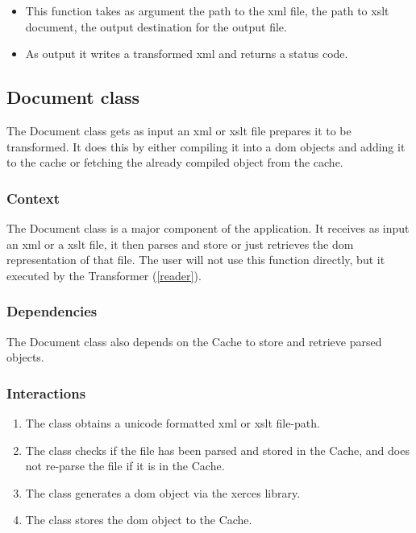 \begin{enmerate}
\begin{itemize}
  \item This function takes as argument the path to the \gls{xml} file, the path to \gls{xslt} document, the output destination for the output file.
  \item As output it writes a transformed \gls{xml} and returns a status code.
\end{itemize}

\subsection{Document class}
\label{document}
\label{parser}

The Document class gets as input an \gls{xml} or \gls{xslt} file prepares it to be transformed.
It does this by either compiling it into a \gls{dom} objects and adding it to the cache or fetching the already compiled object from the cache.

\subsubsection{Context}

The Document class is a major component of the application.
It receives as input an \gls{xml} or a \gls{xslt} file, it then parses and store or just retrieves the \gls{dom} representation of that file.
The user will not use this function directly, but it executed by the Transformer (\ref{reader}).

\subsubsection{Dependencies}

The Document class also depends on the Cache to store and retrieve parsed objects.

\subsubsection{Interactions}

\begin{enumerate}
\item The class obtains a \gls{unicode} formatted \gls{xml} or \gls{xslt} file-path.
\item The class checks if the file has been parsed and stored in the Cache, and does not re-parse the file if it is in the Cache.
\item The class generates a \gls{dom} object via the \gls{xerces} library.
\item The class stores the \gls{dom} object to the Cache.
\end{enumerate}


\end{enmerate}
